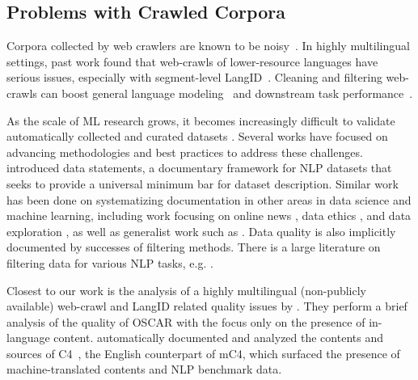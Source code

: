 \subsection{Problems with Crawled Corpora}

Corpora collected by web crawlers are known to be noisy~\citep{junczys-dowmunt-2019-microsoft,luccioni-viviano-2021-whats}. In highly multilingual settings, past work found that web-crawls of lower-resource languages have serious issues, especially with segment-level LangID~\citep{caswell-etal-2020-language}. Cleaning and filtering web-crawls can boost general language modeling~\citep{gao-etal-2020-pile,brown-etal-2020-language,raffel-etal-2020-exploring} and downstream task performance~\citep{moore-lewis-2010-intelligent,rarrick-etal-2011-mt,xu-koehn-2017-zipporah,khayrallah-koehn-2018-impact,brown-etal-2020-language}.

As the scale of ML research grows, it becomes increasingly difficult to validate automatically collected and curated datasets \citep{biderman-etal-2020-pitfalls,birhane-etal-2021-large,bender-etal-2021-on}. Several works have focused on advancing methodologies and best practices to address these challenges. \citet{bender-friedman-2018-data} introduced data statements, a documentary framework for NLP datasets that seeks to provide a universal minimum bar for dataset description. Similar work has been done on systematizing documentation in other areas in data science and machine learning, including work focusing on online news \citep{kevin-etal-2018-information}, data ethics \citep{sun-etal-2019-mithralabel}, and data exploration \citep{holland-etal-2018-the}, as well as generalist work such as \citep{gebru-etal-2018-datasheets}. Data quality is also implicitly documented by successes of filtering methods. There is a large literature on filtering data for various NLP tasks, e.g. \citet{axelrod-etal-2011-domain,moore-lewis-2010-intelligent,rarrick-etal-2011-mt,wang-etal-2018-denoising,kamholz-etal-2014-panlex,junczys-dowmunt-2018-dual,caswell-etal-2020-language}.

Closest to our work is the analysis of a highly multilingual (non-publicly available) web-crawl and LangID related quality issues by \citet{caswell-etal-2020-language}. They perform a brief analysis of the quality of OSCAR with the focus only on the presence of in-language content. \citet{dodge-etal-2021-documenting} automatically documented and analyzed the contents and sources of C4~\citep{raffel-etal-2020-exploring}, the English counterpart of mC4, which surfaced the presence of machine-translated contents and NLP benchmark data.

